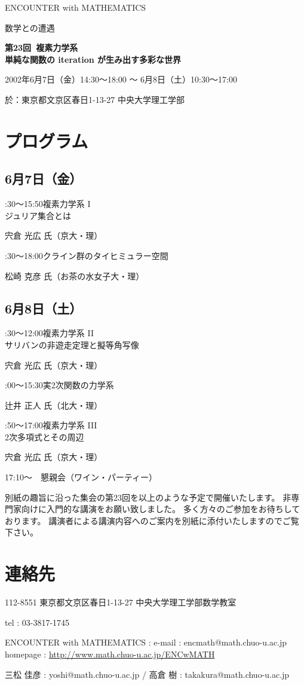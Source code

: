 \documentclass[uplatex,dvipdfmx]{jlreq}
\newcommand{\talk}[3]{%
\noindent
#1\quad #2\par
\hspace*{2em}#3\par\smallskip
}
\newcommand{\EwMnumber}{第23回}
\newcommand{\EwMtitle}{複素力学系\\[2mm]\large 単純な関数の iteration が生み出す多彩な世界}
\newcommand{\EwMdate}{2002年6月7日（金）14:30～18:00 ～ 6月8日（土）10:30～17:00}
\newcommand{\EwMplace}{東京都文京区春日1-13-27 中央大学理工学部}
\newcommand{\EwMtitleblock}{

\vspace*{-5mm}

\begin{center}

{\Large ENCOUNTER with MATHEMATICS}

\vspace{2mm}

{\large 数学との遭遇}

\vspace{4mm}

{\Large \bfseries \EwMnumber\ \EwMtitle}

\vspace{4mm}

\EwMdate

\vspace{2mm}

於：\EwMplace

\end{center}

\vspace{2mm}

}
\begin{document}
\EwMtitleblock


\section*{プログラム}

\subsection*{6月7日（金）}

\talk
{14:30～15:50}
{複素力学系 I\\[1mm]ジュリア集合とは}
{宍倉 光広 氏（京大・理）}

\talk
{16:30～18:00}
{クライン群のタイヒミュラー空間}
{松崎 克彦 氏（お茶の水女子大・理）}

\subsection*{6月8日（土）}

\talk
{10:30～12:00}
{複素力学系 II\\[1mm]サリバンの非遊走定理と擬等角写像}
{宍倉 光広 氏（京大・理）}

\talk
{14:00～15:30}
{実2次関数の力学系}
{辻井 正人 氏（北大・理）}

\talk
{15:50～17:00}
{複素力学系 III\\[1mm]2次多項式とその周辺}
{宍倉 光広 氏（京大・理）}

\bigskip

17:10～　懇親会（ワイン・パーティー）


\bigskip

別紙の趣旨に沿った集会の第23回を以上のような予定で開催いたします。  
非専門家向けに入門的な講演をお願い致しました。  
多く方々のご参加をお待ちしております。  
講演者による講演内容へのご案内を別紙に添付いたしますのでご覧下さい。


\section*{連絡先}

112-8551 東京都文京区春日1-13-27 中央大学理工学部数学教室 

tel : 03-3817-1745  

ENCOUNTER with MATHEMATICS : e-mail : encmath@math.chuo-u.ac.jp  
homepage : \url{http://www.math.chuo-u.ac.jp/ENCwMATH}  

三松 佳彦 : yoshi@math.chuo-u.ac.jp / 高倉 樹 : takakura@math.chuo-u.ac.jp
\end{document}
